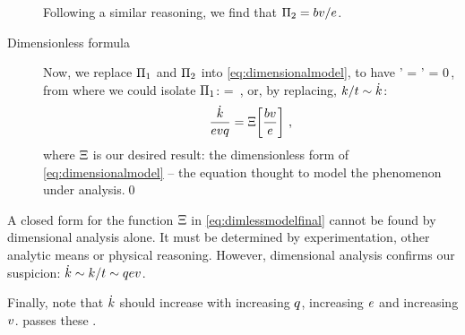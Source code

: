 \begin{description}
Following a similar reasoning, we find that $\Pi_2 = bv/e$.
%
\item[Dimensionless formula] Now, we replace $\Pi_1$ and $\Pi_2$ into \cref{eq:dimensionalmodel}, to have
%
\beq
  \fdim' = \fdim' 
                               = 0\,,
\eeq
%
from where we could isolate $\Pi_1$:
%
\beq
   = \fdim\vat{\dfrac{\mfield\vel}{\efield}}\,,
\eeq
%
or, by replacing, $k/t\sim\dot{k}$:
%
\begin{equation}\label{eq:dimlessmodelfinal}
  \dfrac{\dot{k}}{evq} = \Xi\!\left[{\dfrac{bv}{e}}\right]\,,
\end{equation}
%
where $\Xi$ is our desired result: the dimensionless form of \cref{eq:dimensionalmodel} -- the equation thought to model the phenomenon under analysis.\qed
%
\end{description}
%
A closed form for the function $\Xi$ in \cref{eq:dimlessmodelfinal} cannot be found by dimensional analysis alone. It must be determined by experimentation, other analytic means or physical reasoning. However, dimensional analysis confirms our suspicion: $\dot{k}\sim k/t\sim qev$. 

Finally, note that $\dot{k}$ should increase with increasing $q$, increasing $e$ and increasing $v$.  passes these .
